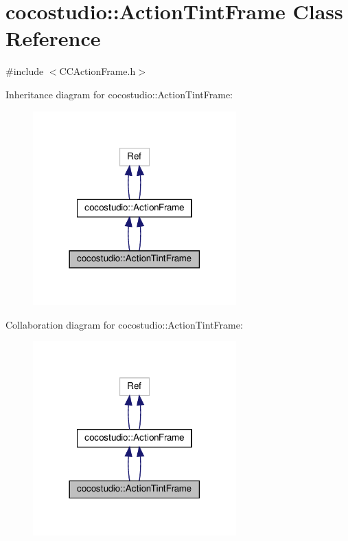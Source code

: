 \hypertarget{classcocostudio_1_1ActionTintFrame}{}\section{cocostudio\+:\+:Action\+Tint\+Frame Class Reference}
\label{classcocostudio_1_1ActionTintFrame}


{\ttfamily \#include $<$C\+C\+Action\+Frame.\+h$>$}



Inheritance diagram for cocostudio\+:\+:Action\+Tint\+Frame\+:
\nopagebreak
\begin{figure}[H]
\begin{center}
\leavevmode
\includegraphics[width=222pt]{classcocostudio_1_1ActionTintFrame__inherit__graph}
\end{center}
\end{figure}


Collaboration diagram for cocostudio\+:\+:Action\+Tint\+Frame\+:
\nopagebreak
\begin{figure}[H]
\begin{center}
\leavevmode
\includegraphics[width=222pt]{classcocostudio_1_1ActionTintFrame__coll__graph}
\end{center}
\end{figure}
